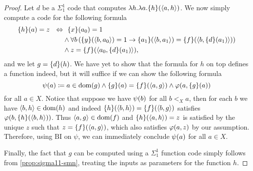 \documentclass[11pt]{article}
\theoremstyle{plain}
\theoremstyle{definition}
\newcommand{\tuple}[1]{\left\langle #1 \right\rangle}
\DeclareMathOperator{\dom}{dom}
\begin{document}
\begin{proof}
    Let $d$ be a $\Sigma^1_1$ code that computes $\lambda h. \lambda a. \mleft\{h\mright\}\mleft(\tuple{a, h}\mright)$. We now simply compute a code for the following formula
    \begin{align*}
        \mleft\{h\mright\}\mleft(a\mright) = z \ \ \ratio\Leftrightarrow & \ \ \mleft\{x\mright\}\mleft(a_0\mright) = 1                                                                                                                                                                                         \\
                                                                         & {} \land \forall b \left(\mleft\{y\mright\}\mleft(\tuple{b, a_0}\mright) = 1 \rightarrow \mleft\{a_1\mright\}\mleft(\tuple{b, a_1}\mright) = \mleft\{f\mright\}\mleft(\tuple{b, \mleft\{d\mright\}\mleft(a_1\mright)}\mright)\right) \\
                                                                         & {} \land z = \mleft\{f\mright\}\mleft(\tuple{a_0, \mleft\{d\mright\}\mleft(a_1\mright)}\mright),
    \end{align*}
    and we let $g = \mleft\{d\mright\}\mleft(h\mright)$. We have yet to show that the formula for $h$ on top defines a function indeed, but it will suffice if we can show the following formula
    \[\psi\mleft(a\mright) \coloneqq a \in \dom\mleft(g\mright) \land \mleft\{g\mright\}\mleft(a\mright) = \mleft\{f\mright\}\mleft(\tuple{a, g}\mright) \land \varphi\mleft(a, \mleft\{g\mright\}\mleft(a\mright)\mright)\]
    for all $a \in X$. Notice that suppose we have $\psi\mleft(b\mright)$ for all $b <_X a$, then for each $b$ we have $\tuple{b, h} \in \dom\mleft(h\mright)$ and indeed $\mleft\{h\mright\}\mleft(\tuple{b, h}\mright) = \mleft\{f\mright\}\mleft(\tuple{b, g}\mright)$ satisfies $\varphi\mleft(b, \mleft\{h\mright\}\mleft(\tuple{b, h}\mright)\mright)$. Thus $\tuple{a, g} \in \dom\mleft(f\mright)$ and $\mleft\{h\mright\}\mleft(\tuple{a, h}\mright) = z$ is satisfied by the unique $z$ such that $z = \mleft\{f\mright\}\mleft(\tuple{a, g}\mright)$, which also satisfies $\varphi\mleft(a, z\mright)$ by our assumption. Therefore, using $\mathrm{BI}$ on $\psi$, we can immediately conclude $\psi\mleft(a\mright)$ for all $a \in X$.

    Finally, the fact that $g$ can be computed using a $\Sigma^1_1$ function code simply follows from \autoref{prop:sigma11-smn}, treating the inputs as parameters for the function $h$.
\end{proof}
\end{document}

